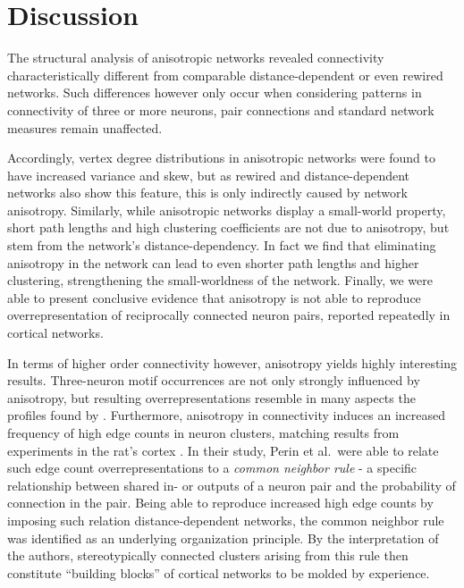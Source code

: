 

\section{Discussion}\label{sec:discussion}

The structural analysis of anisotropic networks revealed connectivity
characteristically different from comparable distance-dependent or
even rewired networks. Such differences however only occur when
considering patterns in connectivity of three or more neurons, pair
connections and standard network measures remain unaffected.

Accordingly, vertex degree distributions in anisotropic networks were
found to have increased variance and skew, but as rewired and
distance-dependent networks also show this feature, this is only
indirectly caused by network anisotropy. Similarly, while
an\-iso\-tro\-pic networks display a small-world property, short path
lengths and high clustering coefficients are not due to anisotropy,
but stem from the network's distance-dependency. In fact we find that
eliminating anisotropy in the network can lead to even shorter path
lengths and higher clustering, strengthening the small-worldness of
the network. Finally, we were able to present conclusive evidence that
anisotropy is not able to reproduce overrepresentation of reciprocally
connected neuron pairs, reported repeatedly in cortical networks.

In terms of higher order connectivity however, anisotropy yields
highly interesting results. Three-neuron motif occurrences are not
only strongly influenced by anisotropy, but resulting
overrepresentations resemble in many aspects the profiles found by
\textcite{Song2005}. Furthermore, anisotropy in connectivity induces
an increased frequency of high edge counts in neuron clusters,
matching results from experiments in the rat's
cortex \parencite{Perin2011}. In their study, Perin et al.\ were able
to relate such edge count overrepresentations to a \textit{common
  neighbor rule} - a specific relationship between shared in- or
outputs of a neuron pair and the probability of connection in the
pair. Being able to reproduce increased high edge counts by imposing
such relation distance-dependent networks, the common neighbor rule
was identified as an underlying organization principle. By the
interpretation of the authors, stereotypically connected clusters
arising from this rule then constitute \enquote{building blocks} of
cortical networks to be molded by experience.

